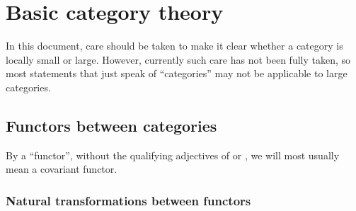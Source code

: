 \section{Basic category theory}

















\begin{convention}
    In this document, care should be taken to make it clear whether a category is locally small or large. However, currently such care has not been fully taken, so most statements that just speak of ``categories'' may not be applicable to large categories.
\end{convention}




\subsection{Functors between categories}



\begin{convention} \label{convention:functors_by_default_are_contravariant}
    By a ``functor'', without the qualifying adjectives of  or , we will most usually mean a covariant functor.
\end{convention}





\subsubsection{Natural transformations between functors}

